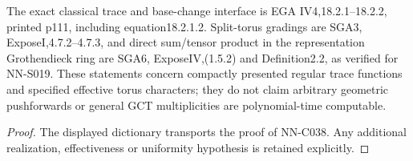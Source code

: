 \begin{geometricstatement}[NN-C038]
The exact classical trace and base-change interface is EGA IV4,18.2.1--18.2.2, printed p111, including equation18.2.1.2. Split-torus gradings are SGA3, ExposeI,4.7.2--4.7.3, and direct sum/tensor product in the representation Grothendieck ring are SGA6, ExposeIV,(1.5.2) and Definition2.2, as verified for NN-S019. These statements concern compactly presented regular trace functions and specified effective torus characters; they do not claim arbitrary geometric pushforwards or general GCT multiplicities are polynomial-time computable.
\end{geometricstatement}
\begin{proof} The displayed dictionary transports the proof of NN-C038. Any additional realization, effectiveness or uniformity hypothesis is retained explicitly.\end{proof}


